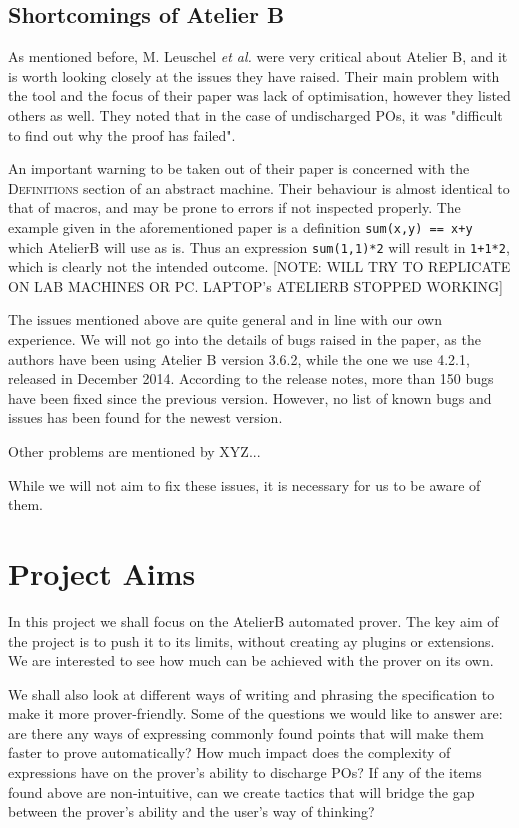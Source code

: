 \documentclass[11pt,journal]{IEEEtran}
\begin{document}
	
	\subsection{Shortcomings of Atelier B}
	
	As mentioned before, M. Leuschel \emph{et al.} were very critical about Atelier B, and it is worth looking closely at the issues they have raised. Their main problem with the tool and the focus of their paper was lack of optimisation, however they listed others as well. They noted that in the case of undischarged POs, it was "difficult to find out why the proof has failed".
	
	An important warning to be taken out of their paper is concerned with the \textsc{Definitions} section of an abstract machine. Their behaviour is almost identical to that of macros, and may be prone to errors if not inspected properly. The example given in the aforementioned paper is a definition \texttt{sum(x,y) == x+y} which AtelierB will use as is. Thus an expression \texttt{sum(1,1)*2} will result in \texttt{1+1*2}, which is clearly not the intended outcome. [NOTE: WILL TRY TO REPLICATE ON LAB MACHINES OR PC. LAPTOP's ATELIERB STOPPED WORKING]
	
	The issues mentioned above are quite general and in line with our own experience. We will not go into the details of bugs raised in the paper, as the authors have been using Atelier B version 3.6.2, while the one we use 4.2.1, released in December 2014. According to the release notes, more than 150 bugs have been fixed since the previous version. However, no list of known bugs and issues has been found for the newest version.\cite{release notes}
	
	Other problems are mentioned by XYZ...
	
	While we will not aim to fix these issues, it is necessary for us to be aware of them. 
	
	
	
	\section{Project Aims}
	In this project we shall focus on the AtelierB automated prover. The key aim of the project is to push it to its limits, without creating ay plugins or extensions. We are interested to see how much can be achieved with the prover on its own.
	
	We shall also look at different ways of writing and phrasing the specification to make it more prover-friendly. Some of the questions we would like to answer are: are there any ways of expressing commonly found points that will make them faster to prove automatically? How much impact does the complexity of expressions have on the prover's ability to discharge POs? If any of the items found above are non-intuitive, can we create tactics that will bridge the gap between the prover's ability and the user's way of thinking?
	
\end{document}
